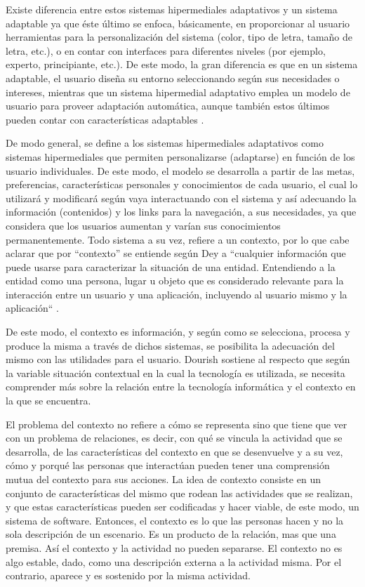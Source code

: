 Existe diferencia entre estos sistemas hipermediales adaptativos y un
sistema adaptable ya que éste último se enfoca, básicamente, en proporcionar
al usuario herramientas para la personalización del sistema (color, tipo de
letra, tamaño de letra, etc.), o en contar con interfaces para diferentes
niveles (por ejemplo, experto, principiante, etc.). De este modo, la gran
diferencia es que en un sistema adaptable, el usuario diseña su entorno
seleccionando según sus necesidades o intereses, mientras que un sistema
hipermedial adaptativo emplea un modelo de usuario para proveer adaptación
automática, aunque también estos últimos pueden contar con características
adaptables \cite{lxxviii}.

De modo general, se define a los sistemas hipermediales adaptativos
como sistemas hipermediales que permiten personalizarse (adaptarse) en
función de los usuario individuales. De este modo, el modelo se desarrolla a
partir de las metas, preferencias, características personales y conocimientos de
cada usuario, el cual lo utilizará y modificará según vaya interactuando con el
sistema y así adecuando la información (contenidos) y los links para la
navegación, a sus necesidades, ya que considera que los usuarios aumentan y
varían sus conocimientos permanentemente. Todo sistema a su vez, refiere a un
contexto, por lo que cabe aclarar que por “contexto” se entiende según Dey
a ``cualquier información que puede usarse para caracterizar la situación de
una entidad. Entendiendo a la entidad como una persona, lugar u objeto
que es considerado relevante para la interacción entre un usuario y una
aplicación, incluyendo al usuario mismo y la aplicación`` \cite{lxxix}.

De este modo, el contexto es información, y según como se selecciona, procesa y
produce la misma a través de dichos sistemas, se posibilita la adecuación del
mismo con las utilidades para el usuario. Dourish \cite{contexto} sostiene al
respecto que según la variable situación contextual en la cual la tecnología es
utilizada, se necesita comprender más sobre la relación entre la tecnología
informática y el contexto en la que se encuentra.

El problema del contexto no refiere a cómo se representa sino que tiene
que ver con un problema de relaciones, es decir, con qué se vincula la
actividad que se desarrolla, de las características del contexto en que se
desenvuelve y a su vez, cómo y porqué las personas que interactúan pueden
tener una comprensión mutua del contexto para sus acciones. La idea de
contexto consiste en un conjunto de características del mismo que rodean las
actividades que se realizan, y que estas características pueden ser codificadas
y hacer viable, de este modo, un sistema de software. Entonces, el contexto es lo que las personas
hacen y no la sola descripción de un escenario. Es un producto de la relación,
mas que una premisa. Así el contexto y la
actividad no pueden separarse. El contexto no es algo estable, dado, como una
descripción externa a la actividad misma. Por el contrario, aparece y es
sostenido por la misma actividad.

